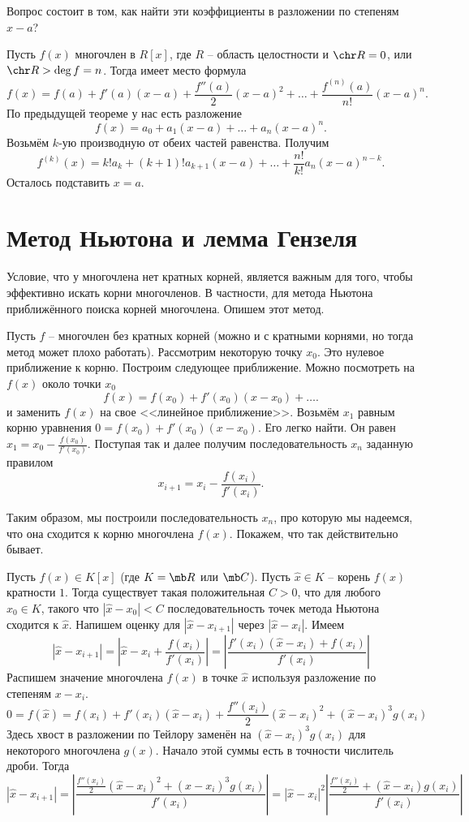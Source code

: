 Вопрос состоит в том, как найти эти коэффициенты в разложении по степеням $x-a$?

Пусть $f(x)$ многочлен в $R[x]$, где $R$ -- область целостности и  $\chr R =0$, или $\chr R > \deg f=n$. Тогда имеет место формула
$$f(x)= f(a)+f'(a)(x-a)+\frac{f''(a)}{2}(x-a)^2+  \dots + \frac{f^{(n)}(a)}{n!}(x-a)^n.$$
\proof По предыдущей теореме у нас есть разложение
$$f(x)=a_0+a_1(x-a)+\dots+a_n(x-a)^n.$$
Возьмём $k$-ую производную от обеих частей равенства. Получим
$$ f^{(k)}(x)=k!a_k+(k+1)!a_{k+1}(x-a)+\dots+\frac{n!}{k!}a_n(x-a)^{n-k}.$$
Осталось подставить $x=a$.
\endproof
\ethrm










\section{Метод Ньютона и лемма Гензеля} 

Условие, что у многочлена нет кратных корней, является важным для того, чтобы эффективно искать корни многочленов. В частности, для метода Ньютона приближённого поиска корней многочлена. Опишем этот метод.


Пусть $f$ -- многочлен без кратных корней (можно и с кратными корнями, но тогда метод может плохо работать). Рассмотрим некоторую точку $x_0$. Это нулевое приближение к корню. Построим следующее приближение. Можно посмотреть на $f(x)$ около точки $x_0$ 
$$f(x)=f(x_0)+f'(x_0)(x-x_0)+\dots.$$
и заменить $f(x)$ на свое <<линейное приближение>>.
Возьмём $x_1$ равным корню уравнения $0=f(x_0)+f'(x_0)(x-x_0)$. Его легко найти. Он равен $x_1=x_0-\frac{f(x_0)}{f'(x_0)}$. Поступая так и далее получим последовательность $x_n$ заданную правилом $$x_{i+1}=x_i-\frac{f(x_i)}{f'(x_i)}.$$

Таким образом, мы построили последовательность $x_n$, про которую мы надеемся, что она сходится к корню многочлена $f(x)$. Покажем, что так действительно бывает.

\thrm Пусть $f(x)\in K[x]$ (где $K=\mb R$ или $\mb C$). Пусть $\hat{x}\in K$ -- корень $f(x)$ кратности $1$. Тогда существует такая положительная $C>0$, что для любого $x_0 \in K$, такого что $|\hat{x}-x_0|<C$ последовательность точек метода Ньютона сходится к $\hat{x}$.
\ethrm
\proof Напишем оценку для $|\hat{x}-x_{i+1}|$ через $|\hat{x}-x_i|$. Имеем 
$$|\hat{x}-x_{i+1}|=\left|\hat{x}-x_i+\frac{f(x_i)}{f'(x_i)}\right|=\left|\frac{f'(x_i)(\hat{x}-x_i)+f(x_i)}{f'(x_i)}\right|$$
Распишем значение многочлена $f(x)$ в точке $\hat{x}$ используя разложение по степеням $x-x_i$. 
$$0=f(\hat{x})= f(x_i)+f'(x_i)(\hat{x}-x_i)+\frac{f''(x_i)}{2}(\hat{x}-x_i)^2 + (\hat{x}-x_i)^3 g(x_i)$$
Здесь хвост в разложении по Тейлору заменён на $(\hat{x}-x_i)^3 g(x_i)$ для некоторого многочлена $g(x)$. Начало этой суммы есть в точности числитель дроби. Тогда
$$|\hat{x}-x_{i+1}|=\left|\frac{\frac{f''(x_i)}{2}(\hat{x}-x_i)^2 + (\hat{x}-x_i)^3 g(x_i)}{f'(x_i)}\right|=|\hat{x}-x_i|^2\left|\frac{\frac{f''(x_i)}{2} + (\hat{x}-x_i) g(x_i)}{f'(x_i)}\right|$$

